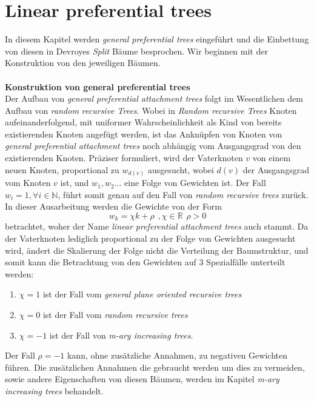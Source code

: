 \chapter{Linear preferential trees} 
In diesem Kapitel werden \textit{general preferential trees} eingeführt und die Einbettung von diesen in Devroyes \textit{Split} Bäume besprochen. Wir beginnen mit der Konstruktion von den jeweiligen Bäumen.
\\
\\
\textbf{\fontsize{14}{18}\selectfont Konstruktion von general preferential trees}\\
Der Aufbau von \textit{general preferential attachment trees} folgt im Wesentlichen dem Aufbau von \textit{random recursive Trees}. Wobei in \textit{Random recursive Trees} Knoten aufeinanderfolgend, mit uniformer Wahrscheinlichkeit als Kind von bereits existierenden Knoten angefügt werden, ist das Anknüpfen von Knoten von \textit{general preferential attachment trees} noch abhängig vom Ausgangsgrad von den existierenden Knoten. Präziser formuliert, wird der Vaterknoten $v$ von einem neuen Knoten, proportional zu $w_{d(v)}$ ausgesucht, wobei $d(v)$ der Ausgangsgrad vom Knoten $v$ ist, und $w_1, w_2...$ eine Folge von Gewichten ist. Der Fall $w_i = 1, \forall i \in \mathbb{N}$, führt somit genau auf den Fall von \textit{random recursive trees} zurück. In dieser Ausarbeitung werden die Gewichte von der Form 
\[
w_k = \chi k + \rho \hspace{5pt}, \chi \in \mathbb{R}\hspace{5pt} \rho > 0
\]
betrachtet, woher der Name \textit{linear preferential attachment trees} auch stammt. Da der Vaterknoten lediglich proportional zu der Folge von Gewichten ausgesucht wird, ändert die Skalierung der Folge nicht die Verteilung der Baumstruktur, und somit kann die Betrachtung von den Gewichten auf 3 Spezialfälle unterteilt werden:
\begin{enumerate}
    \item $\chi = 1$ ist der Fall vom \textit{general plane oriented recursive trees} \cite{panholzer2007level} 
    \item $\chi = 0$ ist der Fall vom \textit{random recursive trees}
    \item $\chi = -1$ ist der Fall von \textit{m-ary increasing trees}.
\end{enumerate}
\begin{Bemerkung}
    Der Fall $\rho = -1$ kann, ohne zusätzliche Annahmen, zu negativen Gewichten führen. Die zusätzlichen Annahmen die gebraucht werden um dies zu vermeiden, sowie andere Eigenschaften von diesen Bäumen, werden im Kapitel \textit{m-ary increasing trees} behandelt.
\end{Bemerkung}

